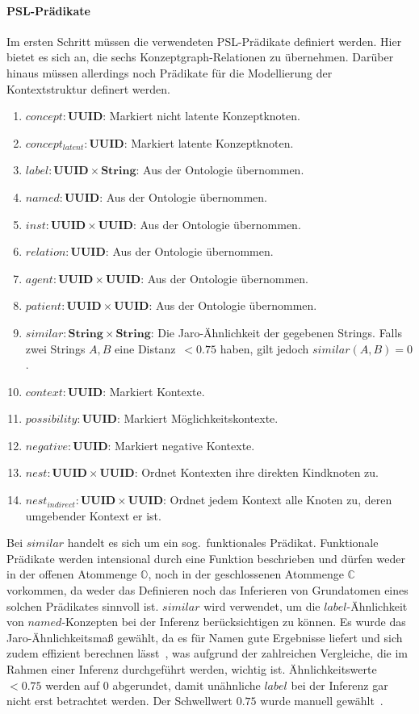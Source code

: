 \paragraph{PSL-Prädikate}
Im ersten Schritt müssen die verwendeten PSL-Prädikate definiert werden.
Hier bietet es sich an, die sechs Konzeptgraph-Relationen zu übernehmen.
Darüber hinaus müssen allerdings noch Prädikate für die Modellierung der Kontextstruktur definert werden.
\begin{enumerate}[noitemsep]
	\item $concept: \textbf{UUID}$: Markiert nicht latente Konzeptknoten.
	\item $concept_{latent}: \textbf{UUID}$: Markiert latente Konzeptknoten.
	\item $label: \textbf{UUID} \times \textbf{String}$: Aus der Ontologie übernommen.
	\item $named: \textbf{UUID}$: Aus der Ontologie übernommen.
	\item $inst: \textbf{UUID} \times \textbf{UUID}$: Aus der Ontologie übernommen.
	\item $relation: \textbf{UUID}$: Aus der Ontologie übernommen.
	\item $agent: \textbf{UUID} \times \textbf{UUID}$: Aus der Ontologie übernommen.
	\item $patient: \textbf{UUID} \times \textbf{UUID}$: Aus der Ontologie übernommen.
	\item $similar: \textbf{String} \times \textbf{String}$: Die Jaro-Ähnlichkeit der gegebenen Strings.
		Falls zwei Strings $A, B$ eine Distanz~$< 0.75$ haben, gilt jedoch $similar(A, B) = 0$.
	\item $context: \textbf{UUID}$: Markiert Kontexte.
	\item $possibility: \textbf{UUID}$: Markiert Möglichkeitskontexte.
	\item $negative: \textbf{UUID}$: Markiert negative Kontexte.
	\item $nest: \textbf{UUID} \times \textbf{UUID}$: Ordnet Kontexten ihre direkten Kindknoten zu.
	\item $nest_{indirect}: \textbf{UUID} \times \textbf{UUID}$: Ordnet jedem Kontext alle Knoten zu, deren umgebender Kontext er ist.
\end{enumerate}
\edef\pslPredCount{\theenumi}

Bei $similar$ handelt es sich um ein sog.\ funktionales Prädikat.
Funktionale Prädikate werden intensional durch eine Funktion beschrieben und dürfen weder in der offenen Atommenge $\mathbb{O}$, noch in der geschlossenen Atommenge $\mathbb{C}$ vorkommen, da weder das Definieren noch das Inferieren von Grundatomen eines solchen Prädikates sinnvoll ist.
$similar$ wird verwendet, um die $label$-Ähnlichkeit von $named$-Konzepten bei der Inferenz berücksichtigen zu können.
Es wurde das Jaro-Ähnlichkeitsmaß gewählt, da es für Namen gute Ergebnisse liefert und sich zudem effizient berechnen lässt~\cite{Christen2006}, was aufgrund der zahlreichen Vergleiche, die im Rahmen einer Inferenz durchgeführt werden, wichtig ist.
Ähnlichkeitswerte~$< 0.75$ werden auf $0$ abgerundet, damit unähnliche $label$ bei der Inferenz gar nicht erst betrachtet werden.
Der Schwellwert $0.75$ wurde manuell gewählt~.

